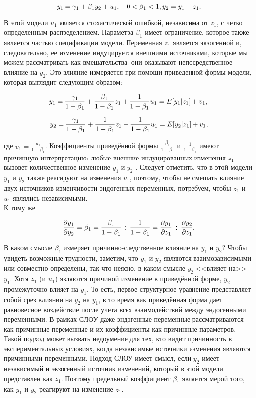 \[
y_{1}=\gamma_{1}+\beta_{1}y_{2}+u_{1}, \quad 0<\beta_{1}<1, \\
y_{2}=y_{1}+z_{1}.
\]


В этой модели $u_{1}$ является стохастической ошибкой, независима от $z_{1}$, с четко определенным распределением. Параметра $\beta_{1}$ имеет ограничение, которое также является частью спецификации модели. Переменная $z_{1}$ является экзогенной и, следовательно, ее изменение индуцируется внешними источниками, которые мы можем рассматривать как вмешательства, они оказывают непосредственное влияние на $y_{2}$. Это влияние измеряется при помощи приведенной формы модели, которая выглядит следующим образом: 

\[
y_{1}=\frac{\gamma_{1}}{1-\beta_{1}}+\frac{\beta_{1}}{1-\beta_{1}}z_{1}+\frac{1}{1-\beta_{1}}u_{1} \\
= E[y_{1}|z_{1}]+v_{1}, \\
\]

\[
y_{2}=\frac{\gamma_{1}}{1-\beta_{1}}+\frac{1}{1-\beta_{1}}z_{1}+\frac{1}{1-\beta_{1}}u_{1} \\
= E[y_{2}|z_{1}]+v_{1},
\]

где $v_{1}=\frac{u_{1}}{1-\beta_{1}}$. Коэффициенты приведённой формы $\frac{\beta_{1}}{1-\beta_{1}}$ и $\frac{1}{1-\beta_{1}}$  имеют причинную интерпретацию: любые внешние индуцированных изменения $z_{1}$ вызовет количественное изменение $y_{1}$ и $y_{2}$ . Следует отметить, что в этой модели $y_{1}$ и $y_{2}$ также реагируют на изменения $u_{1}$, поэтому, чтобы не смешать влияние двух источников изменчивости эндогенных переменных, потребуем, чтобы $z_{1}$ и $u_{1}$ являлись независимыми. \\
	К тому же

\[
\frac{\partial y_{1}}{\partial y_{2}}=\beta_{1}=\frac{\beta_{1}}{1-\beta_{1}}\div\frac{1}{1-\beta_{1}} \\
=\frac{\partial y_{1}}{\partial z_{1}}\div\frac{\partial y_{2}}{\partial z_{1}}.
\]


В каком смысле $\beta_{1}$ измеряет причинно-следственное влияние на $y_{1}$ и $y_{2}$? Чтобы увидеть возможные трудности, заметим, что $y_{1}$ и $y_{2}$ являются взаимозависимыми или совместно определены, так что неясно, в каком смысле $y_{2}$ <<влияет на>> $y_{1}$. Хотя $z_{1}$ (и $u_{1}$) являются причиной изменение в приведённой форме, $y_{2}$ промежуточно влияет на $y_{1}$. То есть, первое структурное уравнение представляет собой срез влиянии на $y_{2}$ на  $y_{1}$, в то время как приведённая форма дает равновесное воздействие после учета всех взаимодействий  между эндогенными переменными. В рамках СЛОУ даже эндогенные переменные рассматриваются как причинные переменные и их коэффициенты как причинные параметров. Такой подход может вызвать недоумение для тех, кто видит причинность в экспериментальных условиях, когда независимые источники изменения являются причинными переменными. Подход СЛОУ имеет смысл, если $y_{2}$ имеет независимый и экзогенный источник изменений, который в этой модели представлен как $z_{1}$. Поэтому предельный коэффициент $\beta_{1}$ является мерой того, как $y_{1}$ и $y_{2}$ реагируют на изменение $z_{1}$. 


